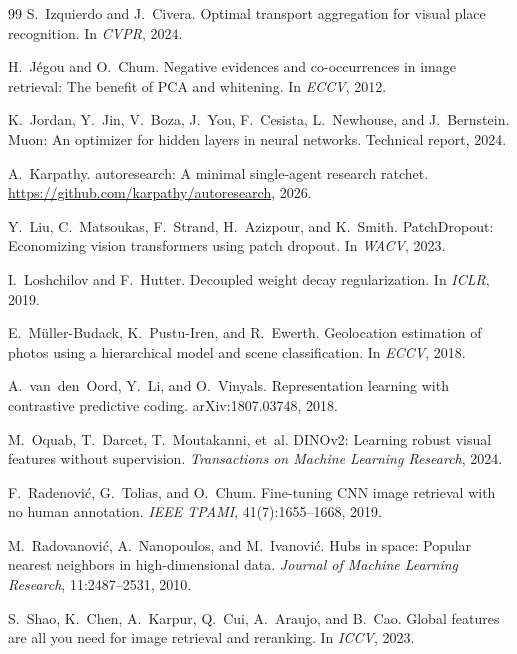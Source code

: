 \documentclass[11pt,a4paper]{article}
\begin{document}
\begin{thebibliography}{99}
S.~Izquierdo and J.~Civera.
\newblock Optimal transport aggregation for visual place recognition.
\newblock In \emph{CVPR}, 2024.

H.~J\'egou and O.~Chum.
\newblock Negative evidences and co-occurrences in image retrieval: The benefit of PCA and
whitening.
\newblock In \emph{ECCV}, 2012.

K.~Jordan, Y.~Jin, V.~Boza, J.~You, F.~Cesista, L.~Newhouse, and J.~Bernstein.
\newblock Muon: An optimizer for hidden layers in neural networks.
\newblock Technical report, 2024.

A.~Karpathy.
\newblock autoresearch: A minimal single-agent research ratchet.
\newblock \url{https://github.com/karpathy/autoresearch}, 2026.

Y.~Liu, C.~Matsoukas, F.~Strand, H.~Azizpour, and K.~Smith.
\newblock PatchDropout: Economizing vision transformers using patch dropout.
\newblock In \emph{WACV}, 2023.

I.~Loshchilov and F.~Hutter.
\newblock Decoupled weight decay regularization.
\newblock In \emph{ICLR}, 2019.

E.~M\"uller-Budack, K.~Pustu-Iren, and R.~Ewerth.
\newblock Geolocation estimation of photos using a hierarchical model and scene
classification.
\newblock In \emph{ECCV}, 2018.

A.~van~den~Oord, Y.~Li, and O.~Vinyals.
\newblock Representation learning with contrastive predictive coding.
\newblock arXiv:1807.03748, 2018.

M.~Oquab, T.~Darcet, T.~Moutakanni, et~al.
\newblock DINOv2: Learning robust visual features without supervision.
\newblock \emph{Transactions on Machine Learning Research}, 2024.

F.~Radenovi\'c, G.~Tolias, and O.~Chum.
\newblock Fine-tuning CNN image retrieval with no human annotation.
\newblock \emph{IEEE TPAMI}, 41(7):1655--1668, 2019.

M.~Radovanovi\'c, A.~Nanopoulos, and M.~Ivanovi\'c.
\newblock Hubs in space: Popular nearest neighbors in high-dimensional data.
\newblock \emph{Journal of Machine Learning Research}, 11:2487--2531, 2010.

S.~Shao, K.~Chen, A.~Karpur, Q.~Cui, A.~Araujo, and B.~Cao.
\newblock Global features are all you need for image retrieval and reranking.
\newblock In \emph{ICCV}, 2023.


\end{thebibliography}
\end{document}

